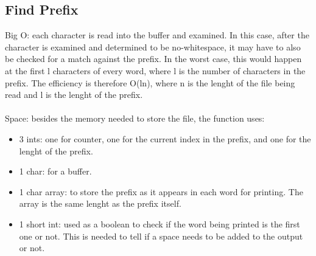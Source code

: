 \documentclass[letterpaper,12pt]{article}
\begin{document}
\subsection{Find Prefix}
Big O: each character is read into the buffer and examined. In this case, after the character is examined and determined to be no-whitespace, it may have to also be checked for a match against the prefix. In the worst case, this would happen at the first l characters of every word, where l is the number of characters in the prefix. The efficiency is therefore O(ln), where n is the lenght of the file being read and l is the lenght of the prefix. \\ \\
Space: besides the memory needed to store the file, the function uses:
\begin{itemize}
	\item 3 ints: one for counter, one for the current index in the prefix, and one for the lenght of the prefix.
	\item 1 char: for a buffer.
	\item 1 char array: to store the prefix as it appears in each word for printing. The array is the same lenght as the prefix itself.
	\item 1 short int: used as a boolean to check if the word being printed is the first one or not. This is needed to tell if a space needs to be added to the output or not.
\end{itemize}
\end{document}
